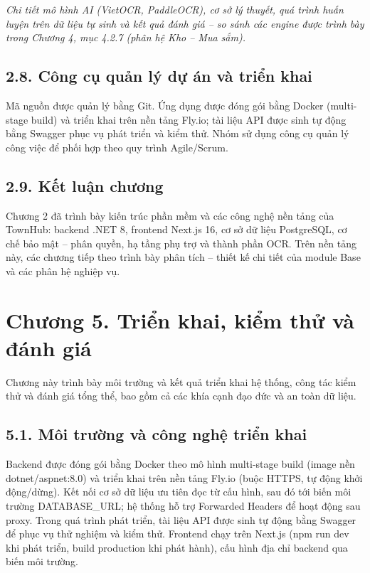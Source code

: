 \textit{Chi tiết mô hình AI (VietOCR, PaddleOCR), cơ sở lý thuyết, quá trình huấn luyện trên dữ liệu tự sinh và kết quả đánh giá – so sánh các engine được trình bày trong Chương 4, mục 4.2.7 (phân hệ Kho – Mua sắm).}

\section*{2.8. Công cụ quản lý dự án và triển khai}
Mã nguồn được quản lý bằng Git. Ứng dụng được đóng gói bằng Docker (multi-stage build) và triển khai trên nền tảng Fly.io; tài liệu API được sinh tự động bằng Swagger phục vụ phát triển và kiểm thử. Nhóm sử dụng công cụ quản lý công việc để phối hợp theo quy trình Agile/Scrum.

\section*{2.9. Kết luận chương}
Chương 2 đã trình bày kiến trúc phần mềm và các công nghệ nền tảng của TownHub: backend .NET 8, frontend Next.js 16, cơ sở dữ liệu PostgreSQL, cơ chế bảo mật – phân quyền, hạ tầng phụ trợ và thành phần OCR. Trên nền tảng này, các chương tiếp theo trình bày phân tích – thiết kế chi tiết của module Base và các phân hệ nghiệp vụ.




\chapter*{Chương 5. Triển khai, kiểm thử và đánh giá}
Chương này trình bày môi trường và kết quả triển khai hệ thống, công tác kiểm thử và đánh giá tổng thể, bao gồm cả các khía cạnh đạo đức và an toàn dữ liệu.

\section*{5.1. Môi trường và công nghệ triển khai}
Backend được đóng gói bằng Docker theo mô hình multi-stage build (image nền dotnet/aspnet:8.0) và triển khai trên nền tảng Fly.io (buộc HTTPS, tự động khởi động/dừng). Kết nối cơ sở dữ liệu ưu tiên đọc từ cấu hình, sau đó tới biến môi trường DATABASE\_URL; hệ thống hỗ trợ Forwarded Headers để hoạt động sau proxy. Trong quá trình phát triển, tài liệu API được sinh tự động bằng Swagger để phục vụ thử nghiệm và kiểm thử. Frontend chạy trên Next.js (npm run dev khi phát triển, build production khi phát hành), cấu hình địa chỉ backend qua biến môi trường.

